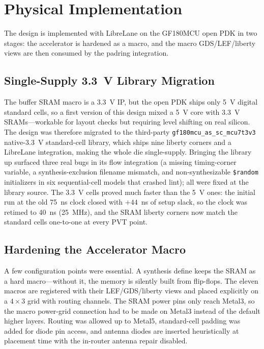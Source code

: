 \documentclass[conference,a4paper]{APSIPA2026}
\begin{document}
\section{Physical Implementation}\label{sec:phys}

The design is implemented with LibreLane \cite{librelane} on the GF180MCU open PDK \cite{gf180pdk} in two stages: the accelerator is hardened as a macro, and the macro GDS/LEF/liberty views are then consumed by the padring integration.

\subsection{Single-Supply 3.3~V Library Migration}
The buffer SRAM macro \cite{gf180sram} is a 3.3~V IP, but the open PDK ships only 5~V digital standard cells, so a first version of this design mixed a 5~V core with 3.3~V SRAMs---workable for layout checks but requiring level shifting on real silicon. The design was therefore migrated to the third-party \texttt{gf180mcu\_as\_sc\_mcu7t3v3} native-3.3~V standard-cell library, which ships nine liberty corners and a LibreLane integration, making the whole die single-supply. Bringing the library up surfaced three real bugs in its flow integration (a missing timing-corner variable, a synthesis-exclusion filename mismatch, and non-synthesizable \texttt{\$random} initializers in six sequential-cell models that crashed lint); all were fixed at the library source. The 3.3~V cells proved much faster than the 5~V ones: the initial run at the old 75~ns clock closed with $+44$~ns of setup slack, so the clock was retimed to 40~ns (25~MHz), and the SRAM liberty corners now match the standard cells one-to-one at every PVT point.

\subsection{Hardening the Accelerator Macro}
A few configuration points were essential. A synthesis define keeps the SRAM as a hard macro---without it, the memory is silently built from flip-flops. The eleven macros are registered with their LEF/GDS/liberty views and placed explicitly on a $4\times3$ grid with routing channels. The SRAM power pins only reach Metal3, so the macro power-grid connection had to be made on Metal3 instead of the default higher layers. Routing was allowed up to Metal5, standard-cell padding was added for diode pin access, and antenna diodes are inserted heuristically at placement time with the in-router antenna repair disabled.
\end{document}
